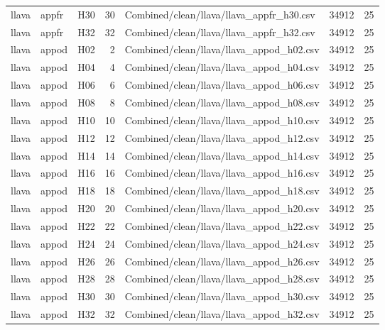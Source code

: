 \begin{longtable}{lllrlrr}
llava & appfr & H30 & 30 & Combined/clean/llava/llava\_appfr\_h30.csv & 34912 & 25 \\
llava & appfr & H32 & 32 & Combined/clean/llava/llava\_appfr\_h32.csv & 34912 & 25 \\
llava & appod & H02 & 2 & Combined/clean/llava/llava\_appod\_h02.csv & 34912 & 25 \\
llava & appod & H04 & 4 & Combined/clean/llava/llava\_appod\_h04.csv & 34912 & 25 \\
llava & appod & H06 & 6 & Combined/clean/llava/llava\_appod\_h06.csv & 34912 & 25 \\
llava & appod & H08 & 8 & Combined/clean/llava/llava\_appod\_h08.csv & 34912 & 25 \\
llava & appod & H10 & 10 & Combined/clean/llava/llava\_appod\_h10.csv & 34912 & 25 \\
llava & appod & H12 & 12 & Combined/clean/llava/llava\_appod\_h12.csv & 34912 & 25 \\
llava & appod & H14 & 14 & Combined/clean/llava/llava\_appod\_h14.csv & 34912 & 25 \\
llava & appod & H16 & 16 & Combined/clean/llava/llava\_appod\_h16.csv & 34912 & 25 \\
llava & appod & H18 & 18 & Combined/clean/llava/llava\_appod\_h18.csv & 34912 & 25 \\
llava & appod & H20 & 20 & Combined/clean/llava/llava\_appod\_h20.csv & 34912 & 25 \\
llava & appod & H22 & 22 & Combined/clean/llava/llava\_appod\_h22.csv & 34912 & 25 \\
llava & appod & H24 & 24 & Combined/clean/llava/llava\_appod\_h24.csv & 34912 & 25 \\
llava & appod & H26 & 26 & Combined/clean/llava/llava\_appod\_h26.csv & 34912 & 25 \\
llava & appod & H28 & 28 & Combined/clean/llava/llava\_appod\_h28.csv & 34912 & 25 \\
llava & appod & H30 & 30 & Combined/clean/llava/llava\_appod\_h30.csv & 34912 & 25 \\
llava & appod & H32 & 32 & Combined/clean/llava/llava\_appod\_h32.csv & 34912 & 25 \\
\end{longtable}
